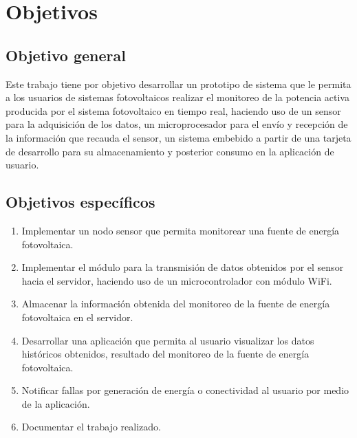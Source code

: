 
\section{Objetivos}

\subsection{Objetivo general}
Este trabajo tiene por objetivo desarrollar un prototipo de sistema que le permita a los usuarios de sistemas fotovoltaicos realizar el monitoreo de la potencia activa producida por el sistema fotovoltaico en tiempo real, haciendo uso de un sensor para la adquisición de los datos, un microprocesador para el envío y recepción de la información que recauda el sensor, un sistema embebido a partir de una tarjeta de desarrollo para su almacenamiento y posterior consumo en la aplicación de usuario.

\subsection{Objetivos específicos}
\begin{enumerate}[label=\arabic*.]
    \item Implementar un nodo sensor que permita monitorear una fuente de energía fotovoltaica.
    \item Implementar el módulo para la transmisión de datos obtenidos por el sensor hacia el servidor, haciendo uso de un microcontrolador con módulo WiFi. 
    \item Almacenar la información obtenida del monitoreo de la fuente de energía fotovoltaica en el servidor.
    \item Desarrollar una aplicación que permita al usuario visualizar los datos históricos obtenidos, resultado del monitoreo de la fuente de energía fotovoltaica.
    \item Notificar fallas por generación de energía o conectividad al usuario por medio de la aplicación.
    \item Documentar el trabajo realizado.
\end{enumerate}
